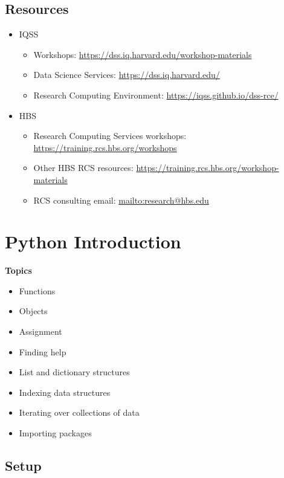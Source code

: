 \documentclass[]{book}
\providecommand{\tightlist}{%
  \setlength{\itemsep}{0pt}\setlength{\parskip}{0pt}}
\begin{document}
\section{Resources}\label{resources-6}

\begin{itemize}
\tightlist
\item
  IQSS

  \begin{itemize}
  \tightlist
  \item
    Workshops: \url{https://dss.iq.harvard.edu/workshop-materials}
  \item
    Data Science Services: \url{https://dss.iq.harvard.edu/}
  \item
    Research Computing Environment:
    \url{https://iqss.github.io/dss-rce/}
  \end{itemize}
\item
  HBS

  \begin{itemize}
  \tightlist
  \item
    Research Computing Services workshops:
    \url{https://training.rcs.hbs.org/workshops}
  \item
    Other HBS RCS resources:
    \url{https://training.rcs.hbs.org/workshop-materials}
  \item
    RCS consulting email: \url{mailto:research@hbs.edu}
  \end{itemize}
\end{itemize}

\chapter{Python Introduction}\label{python-introduction}

\textbf{Topics}

\begin{itemize}
\tightlist
\item
  Functions
\item
  Objects
\item
  Assignment
\item
  Finding help
\item
  List and dictionary structures
\item
  Indexing data structures
\item
  Iterating over collections of data
\item
  Importing packages
\end{itemize}

\section{Setup}\label{setup-4}
\end{document}
